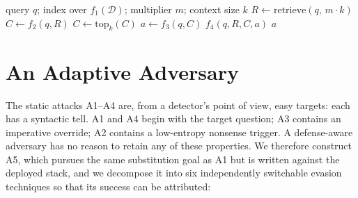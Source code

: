 \documentclass[information,article,submit,moreauthors]{Definitions/mdpi}
\begin{document}
\begin{algorithm}[H]
\caption{Defended query path}
\label{alg:pipeline}
\begin{algorithmic}[1]
\Require query $q$; index over $f_1(\mathcal{D})$; multiplier $m$; context size $k$
\State $R \gets \mathrm{retrieve}(q,\, m\cdot k)$ 
\State $C \gets f_2(q, R)$ 
\State $C \gets \mathrm{top}_k(C)$
\State $a \gets f_3(q, C)$ 
\State $f_4(q, R, C, a)$ 
\State \Return $a$
\end{algorithmic}
\end{algorithm}

\section{An Adaptive Adversary}
\label{sec:adaptive}

The static attacks A1--A4 are, from a detector's point of view, easy targets: each has a
syntactic tell. A1 and A4 begin with the target question; A3 contains an imperative override;
A2 contains a low-entropy nonsense trigger. A defense-aware adversary has no reason to retain
any of these properties. We therefore construct A5, which pursues the same substitution goal as
A1 but is written against the deployed stack, and we decompose it into six independently
switchable evasion techniques so that its success can be attributed:
\end{document}
